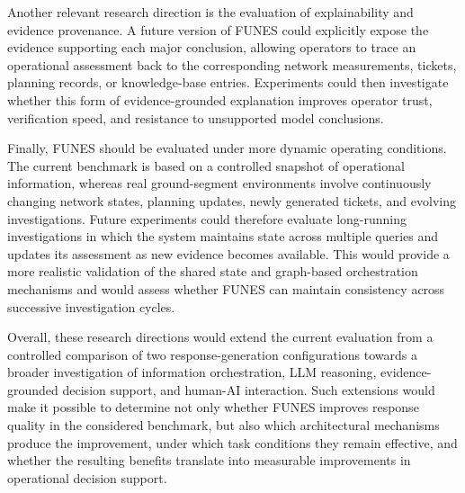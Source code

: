 Another relevant research direction is the evaluation of explainability and evidence provenance. A future version of FUNES could explicitly expose the evidence supporting each major conclusion, allowing operators to trace an operational assessment back to the corresponding network measurements, tickets, planning records, or knowledge-base entries. Experiments could then investigate whether this form of evidence-grounded explanation improves operator trust, verification speed, and resistance to unsupported model conclusions.

Finally, FUNES should be evaluated under more dynamic operating conditions. The current benchmark is based on a controlled snapshot of operational information, whereas real ground-segment environments involve continuously changing network states, planning updates, newly generated tickets, and evolving investigations. Future experiments could therefore evaluate long-running investigations in which the system maintains state across multiple queries and updates its assessment as new evidence becomes available. This would provide a more realistic validation of the shared state and graph-based orchestration mechanisms and would assess whether FUNES can maintain consistency across successive investigation cycles.

Overall, these research directions would extend the current evaluation from a controlled comparison of two response-generation configurations towards a broader investigation of information orchestration, LLM reasoning, evidence-grounded decision support, and human-AI interaction. Such extensions would make it possible to determine not only whether FUNES improves response quality in the considered benchmark, but also which architectural mechanisms produce the improvement, under which task conditions they remain effective, and whether the resulting benefits translate into measurable improvements in operational decision support.